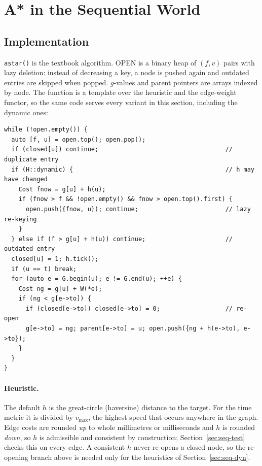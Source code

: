 \section{A* in the Sequential World}
\label{sec:seq}

\subsection{Implementation}

\texttt{astar()} is the textbook algorithm. OPEN is a binary heap of
$(f, v)$ pairs with lazy deletion: instead of decreasing a key, a node is
pushed again and outdated entries are skipped when popped. $g$-values and
parent pointers are arrays indexed by node. The function is a template over
the heuristic and the edge-weight functor, so the same code serves every
variant in this section, including the dynamic ones:

\begin{lstlisting}
while (!open.empty()) {
  auto [f, u] = open.top(); open.pop();
  if (closed[u]) continue;                                   // duplicate entry
  if (H::dynamic) {                                          // h may have changed
    Cost fnow = g[u] + h(u);
    if (fnow > f && !open.empty() && fnow > open.top().first) {
      open.push({fnow, u}); continue;                        // lazy re-keying
    }
  } else if (f > g[u] + h(u)) continue;                      // outdated entry
  closed[u] = 1; h.tick();
  if (u == t) break;
  for (auto e = G.begin(u); e != G.end(u); ++e) {
    Cost ng = g[u] + W(*e);
    if (ng < g[e->to]) {
      if (closed[e->to]) closed[e->to] = 0;                  // re-open
      g[e->to] = ng; parent[e->to] = u; open.push({ng + h(e->to), e->to});
    }
  }
}
\end{lstlisting}

\paragraph{Heuristic.} The default $h$ is the great-circle (haversine) distance
to the target. For the time metric it is divided by $v_{\max}$, the highest
speed that occurs anywhere in the graph. Edge costs are rounded \emph{up} to
whole millimetres or milliseconds and $h$ is rounded \emph{down}, so $h$ is
admissible and consistent by construction; Section~\ref{sec:seq-test} checks
this on every edge. A consistent $h$ never re-opens a closed node, so the
re-opening branch above is needed only for the heuristics of
Section~\ref{sec:seq-dyn}.

